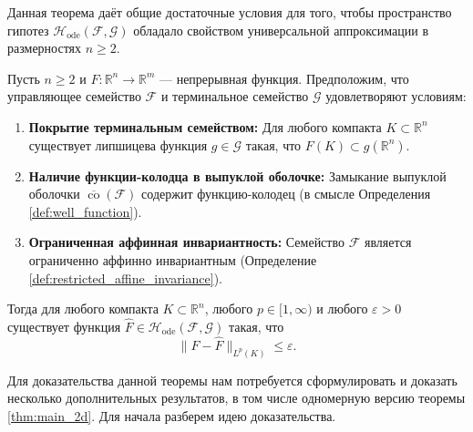\documentclass[../NDCNNAI_main.tex]{subfiles}
\begin{document}
Данная теорема \cite[Теорема 2.3]{Li2023DeepLD} даёт общие достаточные условия для того, чтобы пространство гипотез $\mathcal{H}_{\text{ode}}(\mathcal{F}, \mathcal{G})$ обладало свойством универсальной аппроксимации в размерностях $n \geq 2$.

\begin{theorem}
\label{thm:main_2d}
Пусть $n \geq 2$ и $F\colon \mathbb{R}^n \to \mathbb{R}^m$ --- непрерывная функция. Предположим, что управляющее семейство $\mathcal{F}$ и терминальное семейство $\mathcal{G}$ удовлетворяют условиям:
\begin{enumerate}
    \item \textbf{Покрытие терминальным семейством:} Для любого компакта $K \subset \mathbb{R}^n$ существует липшицева функция $g \in \mathcal{G}$ такая, что $F(K) \subset g(\mathbb{R}^n)$.
    \item \textbf{Наличие функции-колодца в выпуклой оболочке:} Замыкание выпуклой оболочки $\overline{\operatorname{co}}(\mathcal{F})$ содержит функцию-колодец (в смысле Определения \ref{def:well_function}).
    \item \textbf{Ограниченная аффинная инвариантность:} Семейство $\mathcal{F}$ является ограниченно аффинно инвариантным (Определение \ref{def:restricted_affine_invariance}).
\end{enumerate}
Тогда для любого компакта $K \subset \mathbb{R}^n$, любого $p \in [1, \infty)$ и любого $\varepsilon > 0$ существует функция $\hat{F} \in \mathcal{H}_{\text{ode}}(\mathcal{F}, \mathcal{G})$ такая, что
\[
\| F - \hat{F} \|_{L^p(K)} \leq \varepsilon.
\]
\end{theorem}

Для доказательства данной теоремы нам потребуется сформулировать и доказать несколько дополнительных результатов, в том числе одномерную версию теоремы \ref{thm:main_2d}. Для начала разберем идею доказательства.
\end{document}
